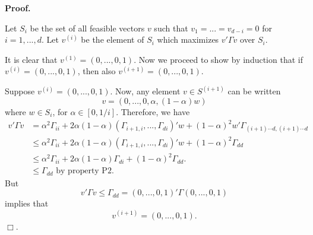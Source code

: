 \documentclass[12pt]{article}
\begin{document}
\noindent\textbf{Proof.}

Let $S_i$ be the set of all feasible vectors $v$ such that $v_1 =
... =v_{d-i} = 0$ for $i = 1,...,d$.  Let $v^{(i)}$ be the element of
$S_i$ which maximizes $v' \Gamma v$ over $S_i$.

It is clear that $v^{(1)} = (0,...,0, 1)$.  Now we proceed to show by
induction that if $v^{(i)} = (0,...,0,1)$, then also $v^{(i+1)} = (0,
...,0,1)$.

Suppose  $v^{(i)} = (0,...,0,1)$.  Now, any element $v \in S^{(i+1)}$ can be written
\[
v = (0, ..., 0, \alpha, (1-\alpha) w)
\]
where $w \in S_i$, for $\alpha \in [0,1/i]$.
Therefore, we have
\begin{align*}
v' \Gamma v &= \alpha^2 \Gamma_{ii} + 2 \alpha (1-\alpha) (\Gamma_{i+1, i},...,\Gamma_{di})' w + (1-\alpha)^2 w' \Gamma_{(i+1) \cdots d, (i+1) \cdots d}
\\&\leq \alpha^2 \Gamma_{ii} + 2 \alpha (1-\alpha) (\Gamma_{i+1, i},...,\Gamma_{di})' w + (1-\alpha)^2 \Gamma_{dd}
\\&\leq \alpha^2 \Gamma_{ii} + 2 \alpha (1-\alpha) \Gamma_{di} + (1-\alpha)^2 \Gamma_{dd}.
\\&\leq \Gamma_{dd}\text{ by property P2}.
\end{align*}
But
\[
v' \Gamma v \leq \Gamma_{dd} = (0,...,0,1)' \Gamma (0,...,0,1)
\]
implies that
\[
v^{(i+1)} = (0,...,0,1).
\]
$\Box$.


\end{document}
